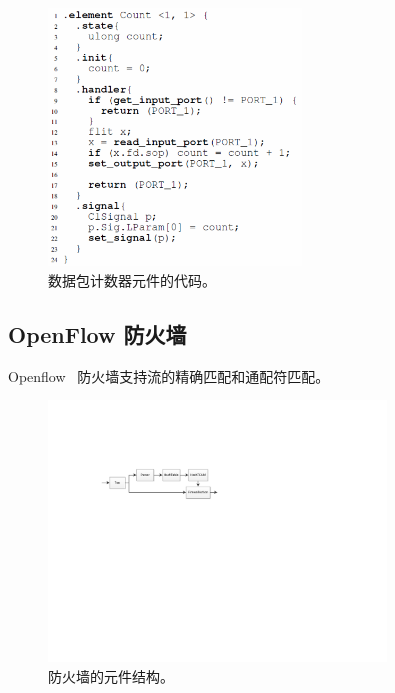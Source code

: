 \begin{figure}[htbp]
	\centering
	\includegraphics[width=0.6\textwidth]{image/count-element}
	\caption{数据包计数器元件的代码。}
	\label{clicknp:fig:count-element}
\end{figure}



\subsection{OpenFlow 防火墙}
Openflow~\cite {mckeown2008openflow} 防火墙支持流的精确匹配和通配符匹配。


\begin{figure}[htbp]
	\centering
	\includegraphics[width=0.8\textwidth]{image/Firewall}
	\caption{防火墙的元件结构。}
	\label{clicknp:fig:firewall-arch}
\end{figure}


